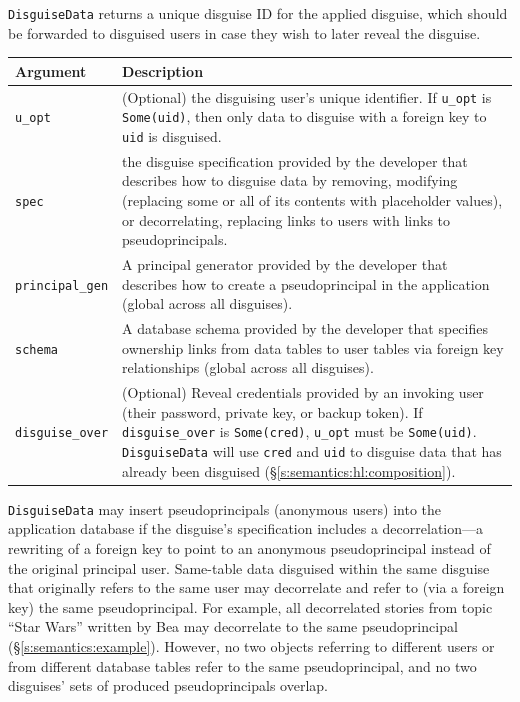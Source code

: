     \texttt{DisguiseData} returns a unique disguise ID for the applied disguise, which should be
    forwarded to disguised users in case they wish to later reveal the
    disguise.

    \begin{center}
    \begin{longtable}{|m{}|m{}|}
        \hline
        \textbf{Argument} & \textbf{Description} \\
        \hline
        \texttt{u\_opt}& (Optional) the disguising user's unique identifier. If
            \texttt{u\_opt} is \texttt{Some(uid)}, then only data to disguise with
            a foreign key to \texttt{uid} is disguised.\\

        \hline
        \texttt{spec}& the disguise specification provided by the
            developer that describes how to disguise data by
    removing, modifying (replacing some or all of its contents with placeholder
    values), or decorrelating, replacing links to users with links to
    pseudoprincipals.\\

        \hline
        \texttt{principal\_gen}& A principal generator provided by the developer
    that describes how to create a pseudoprincipal in the application (global
            across all disguises).\\
        \hline
        \texttt{schema}& A database schema provided by the developer that specifies
    ownership links from data tables to user tables via foreign key
    relationships (global across all disguises).\\

        \hline
        \texttt{disguise\_over}& (Optional) Reveal credentials provided by an
        invoking user (their password, private key, or backup token).
    If \texttt{disguise\_over} is \texttt{Some(cred)}, \texttt{u\_opt} must be
    \texttt{Some(uid)}. \texttt{DisguiseData} will use \texttt{cred} and
    \texttt{uid} to disguise data that has already been disguised
    (\S\ref{s:semantics:hl:composition}).\\
        \hline
    \end{longtable}
    \end{center}

\texttt{DisguiseData} may insert pseudoprincipals (anonymous users) into the
application database if the disguise's specification includes a
decorrelation---a rewriting of a foreign key to point to an anonymous
pseudoprincipal instead of the original principal user. 
%
Same-table data disguised within the same disguise that originally refers to the
same user may decorrelate and refer to (via a foreign key) the same
pseudoprincipal.
%
For example, all decorrelated stories from topic ``Star Wars'' written by Bea
may decorrelate to the same pseudoprincipal (\S\ref{s:semantics:example}).
%
However, no two objects referring to different users or from different database
tables refer to the same pseudoprincipal, and no two disguises' sets of produced
pseudoprincipals overlap.
%

